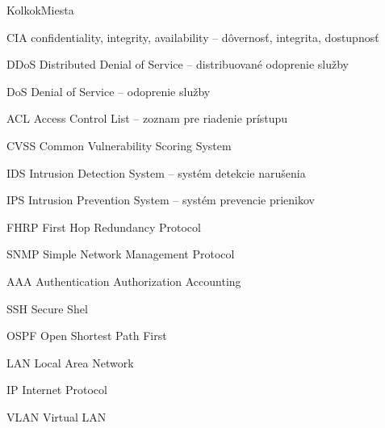 \begin{seznamzkratek}{KolkokMiesta}

		{CIA} %
		{confidentiality, integrity, availability -- dôvernosť, integrita, dostupnosť} %

		{DDoS} %
		{Distributed Denial of Service -- distribuované odoprenie služby} %
	
	{DoS} %
	{Denial of Service -- odoprenie služby} %

		{ACL} %
		{Access Control List -- zoznam pre riadenie prístupu} %

		{CVSS} %
		{Common Vulnerability Scoring System} %
		
		{IDS} %
		{Intrusion Detection System -- systém detekcie narušenia} %

		{IPS} %
		{Intrusion Prevention System -- systém prevencie prienikov} %

		{FHRP} %
		{First Hop Redundancy Protocol} %

		{SNMP} %
		{Simple Network Management Protocol} %
	
	{AAA} %
	{Authentication Authorization Accounting} %
	
	{SSH} %
	{Secure Shel} %
	
	{OSPF} %
	{Open Shortest Path First} %

	{LAN} %
	{Local Area Network} %

	{IP} %
	{Internet Protocol} %
	
	{VLAN} %
	{Virtual LAN} %

\end{seznamzkratek}
